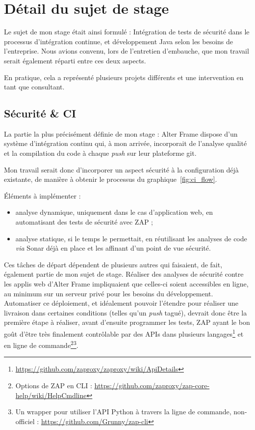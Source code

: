 \section{Détail du sujet de stage}
\label{sec:sujet}
Le sujet de mon stage était ainsi formulé : \og Intégration de tests de sécurité dans le processus d'intégration continue, et développement Java selon les besoins de l'entreprise. \fg Nous avions convenu, lors de l'entretien d'embauche, que mon travail serait également réparti entre ces deux aspects. 

En pratique, cela a représenté plusieurs projets différents et une intervention en tant que consultant. 

\subsection{Sécurité \& CI}
La partie la plus précisément définie de mon stage : Alter Frame dispose d'un système d'intégration continu qui, à mon arrivée, incorporait de l'analyse qualité et la compilation du code à chaque \textit{push} sur leur plateforme git. 

Mon travail serait donc d'incorporer un aspect sécurité à la configuration déjà existante, de manière à obtenir le processus du graphique~\ref{fig:ci_flow}.

Éléments à implémenter :
\begin{itemize}[label=$\bullet$]
  \item analyse dynamique, uniquement dans le cas d'application web, en automatisant des tests de sécurité avec ZAP ;
  \item analyse statique, si le temps le permettait, en réutilisant les analyses de code \textit{via} Sonar déjà en place et les affinant d'un point de vue sécurité. 
\end{itemize}
Ces tâches de départ dépendent de plusieurs autres qui faisaient, de fait, également partie de mon sujet de stage. Réaliser des analyses de sécurité contre les applis web d'Alter Frame impliquaient que celles-ci soient accessibles en ligne, au minimum sur un serveur privé pour les besoins du développement. Automatiser ce déploiement, et idéalement pouvoir l'étendre pour réaliser une livraison dans certaines conditions (telles qu'un \textit{push} tagué), devrait donc être la première étape à réaliser, avant d'ensuite programmer les tests, ZAP ayant le bon goût d'être très finalement contrôlable par des APIs dans plusieurs langages\footnote{\url{https://github.com/zaproxy/zaproxy/wiki/ApiDetails}} et en ligne de commande\footnote{Options de ZAP en CLI : \url{https://github.com/zaproxy/zap-core-help/wiki/HelpCmdline}}\footnote{Un wrapper pour utiliser l'API Python à travers la ligne de commande, non-officiel : \url{https://github.com/Grunny/zap-cli}}.

